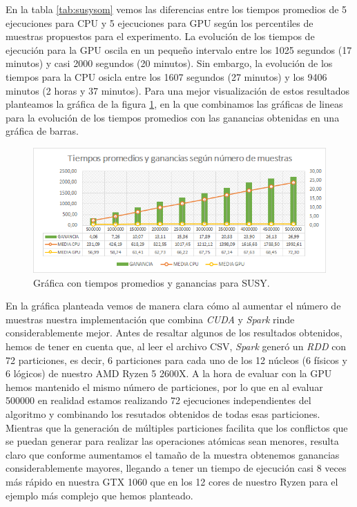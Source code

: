 En la tabla \ref{tab:susysom} vemos las diferencias entre los tiempos promedios de 5 ejecuciones para CPU y 5 ejecuciones para GPU según los percentiles de muestras propuestos para el experimento. La evolución de los tiempos de ejecución para la GPU oscila en un pequeño intervalo entre los 1025 segundos (17 minutos) y casi 2000 segundos (20 minutos). Sin embargo, la evolución de los tiempos para la CPU osicla entre los 1607 segundos (27 minutos) y los 9406 minutos (2 horas y 37 minutos).  Para una mejor visualización de estos resultados planteamos la gráfica de la figura \ref{img:somsusy}, en la que combinamos las gráficas de lineas para la evolución de los tiempos promedios con las ganancias obtenidas en una gráfica de barras. \\

\begin{figure}[ht]
\centering
\includegraphics[scale=0.7]{imagenes/susysom.png}
\caption{Gráfica con tiempos promedios y ganancias para SUSY.}
\label{img:somsusy}
\end{figure}

En la gráfica planteada vemos de manera clara cómo al aumentar el número de muestras nuestra implementación que combina \textit{CUDA} y \textit{Spark} rinde considerablemente mejor. Antes de resaltar algunos de los resultados obtenidos, hemos de tener en cuenta que, al leer el archivo CSV, \textit{Spark} generó un \textit{RDD} con 72 particiones, es decir, 6 particiones para cada uno de los 12 núcleos (6 físicos y 6 lógicos) de nuestro AMD Ryzen 5 2600X. A la hora de evaluar con la GPU hemos mantenido el mismo número de particiones, por lo que en al evaluar 500000 en realidad estamos realizando 72 ejecuciones independientes del algoritmo y combinando los resutados obtenidos de todas esas particiones. Mientras que la generación de múltiples particiones facilita que los conflictos que se puedan generar para realizar las operaciones atómicas sean menores, resulta claro que conforme aumentamos el tamaño de la muestra obtenemos ganancias considerablemente mayores, llegando a tener un tiempo de ejecución casi 8 veces más rápido en nuestra GTX 1060 que en los 12 cores de nuestro Ryzen para el ejemplo más complejo que hemos planteado.



